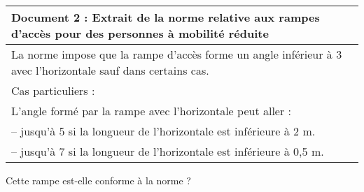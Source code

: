 \documentclass[10pt]{article}
\begin{document}
\begin{tabularx}{\linewidth}{|X|}\hline
\textbf{Document 2 : Extrait de la norme relative aux rampes d'accès pour des personnes à mobilité réduite}\\ \hline
La norme impose que la rampe d'accès forme un angle inférieur à 3\degres{} avec l'horizontale sauf dans certains cas. \\

Cas particuliers :\\ 
L'angle formé par la rampe avec l'horizontale peut aller :\\ 
\hspace{1cm} -- jusqu'à 5\degres{} si la longueur de l'horizontale est inférieure à 2 m. \\
\hspace{1cm} -- jusqu'à 7\degres{} si la longueur de l'horizontale est inférieure à 0,5 m. \\ \hline
\end{tabularx}

\medskip

Cette rampe est-elle conforme à la norme ?
\end{document}
